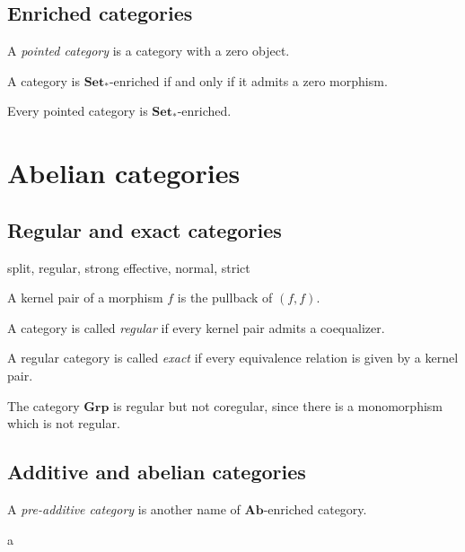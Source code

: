 \documentclass{../../large}
\newcommand{\Set}{\mathbf{Set}}
\newcommand{\Grp}{\mathbf{Grp}}
\newcommand{\Ab}{\mathbf{Ab}}
\begin{document}
\section{Enriched categories}

\begin{prb}
A \emph{pointed category} is a category with a zero object.
\begin{parts}
\item A category is $\Set_*$-enriched if and only if it admits a zero morphism.
\item Every pointed category is $\Set_*$-enriched.
\end{parts}
\end{prb}

\chapter{Abelian categories}
\section{Regular and exact categories}

split, regular, strong
effective, normal, strict

A kernel pair of a morphism $f$ is the pullback of $(f,f)$.

A category is called \emph{regular} if every kernel pair admits a coequalizer.

\begin{prb}
A regular category is called \emph{exact} if every equivalence relation is given by a kernel pair.
\begin{parts}
\end{parts}
\end{prb}

The category $\Grp$ is regular but not coregular, since there is a monomorphism which is not regular.


\section{Additive and abelian categories}

\begin{prb}
A \emph{pre-additive category} is another name of $\Ab$-enriched category.
\begin{parts}
\item a
\end{parts}
\end{prb}
\end{document}
